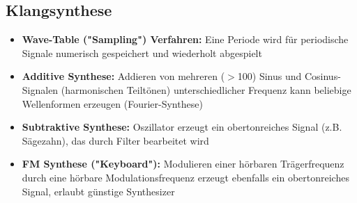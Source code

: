 \documentclass[12pt,landscape]{article}
\begin{document}
\begin{multicols}{3}
\begin{itemize}
\end{itemize}
\subsection{Klangsynthese}
\begin{itemize}
\item \textbf{Wave-Table ("Sampling") Verfahren:} Eine Periode wird für periodische Signale numerisch gespeichert und wiederholt abgespielt
\item \textbf{Additive Synthese:} Addieren von mehreren ($>$100) Sinus und Cosinus-Signalen (harmonischen Teiltönen) unterschiedlicher Frequenz kann beliebige Wellenformen erzeugen (Fourier-Synthese)
\item \textbf{Subtraktive Synthese:} Oszillator erzeugt ein obertonreiches Signal (z.B. Sägezahn), das durch Filter bearbeitet wird
\item \textbf{FM Synthese ("Keyboard"):} Modulieren einer hörbaren Trägerfrequenz durch eine hörbare Modulationsfrequenz erzeugt ebenfalls ein obertonreiches Signal, erlaubt günstige Synthesizer
\end{itemize}

\end{multicols}
\end{document}
